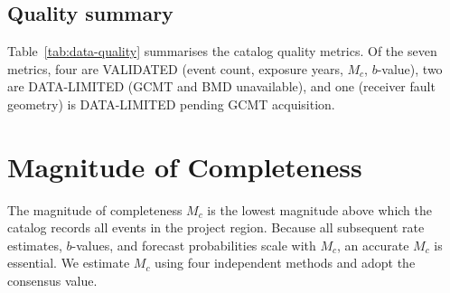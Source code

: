 \documentclass[10pt,a4paper,twocolumn]{article}
\begin{document}
\subsection{Quality summary}

Table~\ref{tab:data-quality} summarises the catalog quality metrics. Of the seven metrics, four are VALIDATED (event count, exposure years, $M_c$, $b$-value), two are DATA-LIMITED (GCMT and BMD unavailable), and one (receiver fault geometry) is DATA-LIMITED pending GCMT acquisition.

\begin{table}[t]
\centering
\caption{Catalog data-quality summary.}\label{tab:data-quality}
\footnotesize
{}
\end{table}

\section{Magnitude of Completeness}\label{sec:mc}

The magnitude of completeness $M_c$ is the lowest magnitude above which the catalog records all events in the project region. Because all subsequent rate estimates, $b$-values, and forecast probabilities scale with $M_c$, an accurate $M_c$ is essential. We estimate $M_c$ using four independent methods and adopt the consensus value.
\end{document}
